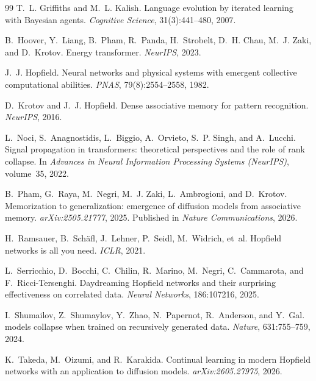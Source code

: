 \documentclass[preprint,12pt,authoryear]{elsarticle}
\begin{document}
\begin{thebibliography}{99}
T.~L. Griffiths and M.~L. Kalish.
\newblock Language evolution by iterated learning with {Bayesian} agents.
\newblock \emph{Cognitive Science}, 31(3):441--480, 2007.

B.~Hoover, Y.~Liang, B.~Pham, R.~Panda, H.~Strobelt, D.~H. Chau, M.~J.
Zaki, and D.~Krotov.
\newblock Energy transformer.
\newblock \emph{NeurIPS}, 2023.

J.~J. Hopfield.
\newblock Neural networks and physical systems with emergent collective
computational abilities.
\newblock \emph{PNAS}, 79(8):2554--2558, 1982.

D.~Krotov and J.~J. Hopfield.
\newblock Dense associative memory for pattern recognition.
\newblock \emph{NeurIPS}, 2016.

L.~Noci, S.~Anagnostidis, L.~Biggio, A.~Orvieto, S.~P. Singh, and
A.~Lucchi.
\newblock Signal propagation in transformers: theoretical perspectives and
the role of rank collapse.
\newblock In \emph{Advances in Neural Information Processing Systems
(NeurIPS)}, volume~35, 2022.

B.~Pham, G.~Raya, M.~Negri, M.~J. Zaki, L.~Ambrogioni, and D.~Krotov.
\newblock Memorization to generalization: emergence of diffusion models
from associative memory.
\newblock \emph{arXiv:2505.21777}, 2025. Published in \emph{Nature
Communications}, 2026.

H.~Ramsauer, B.~Sch{\"a}fl, J.~Lehner, P.~Seidl, M.~Widrich, et~al.
\newblock Hopfield networks is all you need.
\newblock \emph{ICLR}, 2021.

L.~Serricchio, D.~Bocchi, C.~Chilin, R.~Marino, M.~Negri, C.~Cammarota, and
F.~Ricci-Tersenghi.
\newblock Daydreaming {H}opfield networks and their surprising
effectiveness on correlated data.
\newblock \emph{Neural Networks}, 186:107216, 2025.

I.~Shumailov, Z.~Shumaylov, Y.~Zhao, N.~Papernot, R.~Anderson, and
Y.~Gal.
 models collapse when trained on recursively generated data.
\newblock \emph{Nature}, 631:755--759, 2024.

K.~Takeda, M.~Oizumi, and R.~Karakida.
\newblock Continual learning in modern {H}opfield networks with an
application to diffusion models.
\newblock \emph{arXiv:2605.27975}, 2026.


\end{thebibliography}
\end{document}
